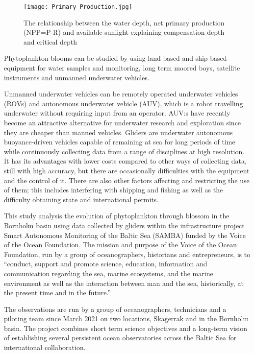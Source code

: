 \documentclass[../Main.tex]{subfiles}
\begin{document}
\begin{figure}[H]
\texttt{[image: Primary\_Production.jpg]}
\caption{The relationship between the water depth, net primary production (NPP=P-R) and available sunlight explaining compensation depth and critical depth\supercite{Prim2021}}
\end{figure}

Phytoplankton blooms can be studied by using land-based and ship-based equipment for water samples and monitoring, 
long term moored boys, satellite instruments and unmanned underwater vehicles.\supercite{100YearsofProgressinOceanObservingSystems}

Unmanned underwater vehicles can be remotely operated underwater vehicles (ROVs) and autonomous underwater vehicle (AUV), 
which is a robot travelling underwater without requiring input from an operator.  
AUV:s have recently become an attractive alternative for underwater research and exploration since they are cheaper than manned vehicles. 
Gliders are underwater autonomous buoyance-driven vehicles capable of remaining at sea for long periods of time while continuously collecting data from a range of disciplines at high resolution. 
It has its advantages with lower costs compared to other ways of collecting data, 
still with high accuracy, but there are occasionally difficulties with the equipment and the control of it. 
There are also other factors affecting and restricting the use of them; 
this includes interfering with shipping and fishing as well as the difficulty obtaining state and international permits.

This study analysis the evolution of phytoplankton through blossom in the Bornholm basin using data collected by gliders within the infrastructure project Smart Autonomous Monitoring of the Baltic Sea (SAMBA) funded by the Voice of the Ocean Foundation.\supercite{queste}
The mission and purpose of the Voice of the Ocean Foundation, run by a group of oceanographers, historians and entrepreneurs, 
is to “conduct, support and promote science, education, information and communication regarding the sea, marine ecosystems, 
and the marine environment as well as the interaction between man and the sea, historically, at the present time and in the future.”\supercite{VOTO2021} 

The observations are run by a group of oceanographers, technicians and a piloting team since March 2021 on two locations, Skagerrak and in the Bornholm basin. 
The project combines short term science objectives and a long-term vision of establishing several persistent ocean observatories across the Baltic Sea for international collaboration.\supercite{queste}
\end{document}
